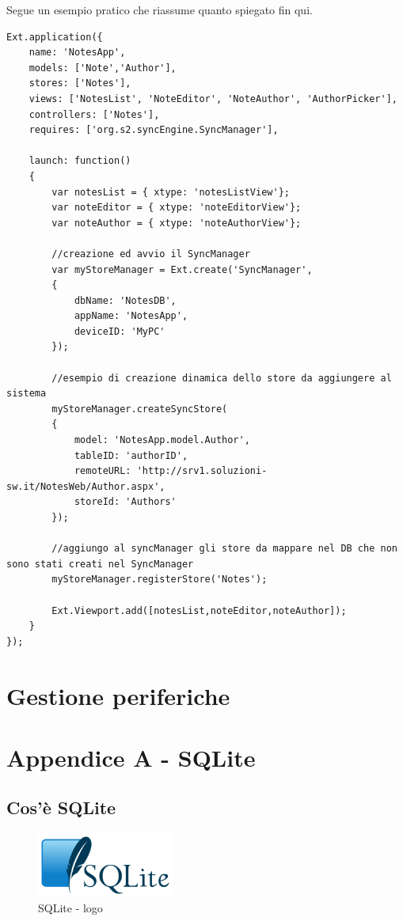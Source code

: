 \documentclass[10pt,a4paper,onecolumn]{article}
\begin{document}
Segue un esempio pratico che riassume quanto spiegato fin qui.

\begin{lstlisting}
Ext.application({
	name: 'NotesApp',
	models: ['Note','Author'],
	stores: ['Notes'],
	views: ['NotesList', 'NoteEditor', 'NoteAuthor', 'AuthorPicker'],
	controllers: ['Notes'],
	requires: ['org.s2.syncEngine.SyncManager'],
	
	launch: function()
	{
		var notesList = { xtype: 'notesListView'};
		var noteEditor = { xtype: 'noteEditorView'};
		var noteAuthor = { xtype: 'noteAuthorView'};
		
		//creazione ed avvio il SyncManager
		var myStoreManager = Ext.create('SyncManager',
		{
			dbName: 'NotesDB',
			appName: 'NotesApp',
			deviceID: 'MyPC'
		});
		
		//esempio di creazione dinamica dello store da aggiungere al sistema
		myStoreManager.createSyncStore(
		{
			model: 'NotesApp.model.Author',
			tableID: 'authorID',
			remoteURL: 'http://srv1.soluzioni-sw.it/NotesWeb/Author.aspx',
			storeId: 'Authors'
		});
		
		//aggiungo al syncManager gli store da mappare nel DB che non sono stati creati nel SyncManager
		myStoreManager.registerStore('Notes');
		
		Ext.Viewport.add([notesList,noteEditor,noteAuthor]);
	}
});
\end{lstlisting}

\clearpage

\section{Gestione periferiche}


\clearpage

\section{Appendice A - SQLite}

\subsection{Cos'è SQLite}

\begin{figure}[h]
	\centering
	\includegraphics[width=0.4\textwidth]{img/SQLite}
	\caption{SQLite - logo}						
	\label{fig:sqllite logo}
\end{figure}
\end{document}
